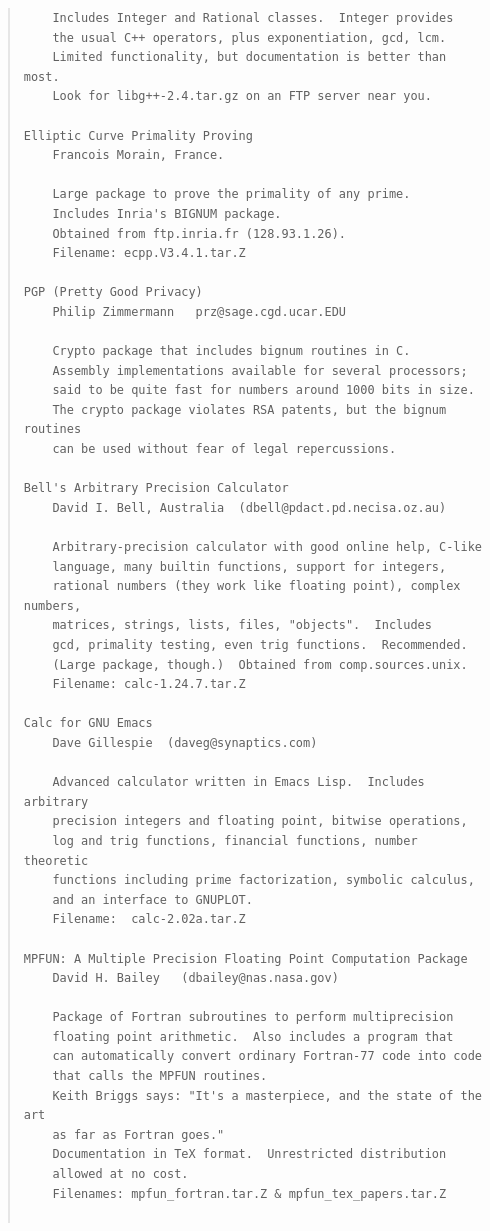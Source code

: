 \begin{quote}
\begin{scriptsize}
\begin{verbatim}
    Includes Integer and Rational classes.  Integer provides
    the usual C++ operators, plus exponentiation, gcd, lcm.
    Limited functionality, but documentation is better than most.
    Look for libg++-2.4.tar.gz on an FTP server near you.

Elliptic Curve Primality Proving 
    Francois Morain, France.

    Large package to prove the primality of any prime.
    Includes Inria's BIGNUM package. 
    Obtained from ftp.inria.fr (128.93.1.26).
    Filename: ecpp.V3.4.1.tar.Z

PGP (Pretty Good Privacy)
    Philip Zimmermann   prz@sage.cgd.ucar.EDU

    Crypto package that includes bignum routines in C.
    Assembly implementations available for several processors;
    said to be quite fast for numbers around 1000 bits in size.
    The crypto package violates RSA patents, but the bignum routines
    can be used without fear of legal repercussions.

Bell's Arbitrary Precision Calculator
    David I. Bell, Australia  (dbell@pdact.pd.necisa.oz.au)

    Arbitrary-precision calculator with good online help, C-like
    language, many builtin functions, support for integers,
    rational numbers (they work like floating point), complex numbers,
    matrices, strings, lists, files, "objects".  Includes 
    gcd, primality testing, even trig functions.  Recommended.
    (Large package, though.)  Obtained from comp.sources.unix.
    Filename: calc-1.24.7.tar.Z

Calc for GNU Emacs
    Dave Gillespie  (daveg@synaptics.com)
   
    Advanced calculator written in Emacs Lisp.  Includes arbitrary
    precision integers and floating point, bitwise operations,
    log and trig functions, financial functions, number theoretic
    functions including prime factorization, symbolic calculus,
    and an interface to GNUPLOT.
    Filename:  calc-2.02a.tar.Z

MPFUN: A Multiple Precision Floating Point Computation Package
    David H. Bailey   (dbailey@nas.nasa.gov)

    Package of Fortran subroutines to perform multiprecision
    floating point arithmetic.  Also includes a program that
    can automatically convert ordinary Fortran-77 code into code
    that calls the MPFUN routines.  
    Keith Briggs says: "It's a masterpiece, and the state of the art 
    as far as Fortran goes."
    Documentation in TeX format.  Unrestricted distribution
    allowed at no cost.
    Filenames: mpfun_fortran.tar.Z & mpfun_tex_papers.tar.Z


\end{verbatim}
\end{scriptsize}
\end{quote}
